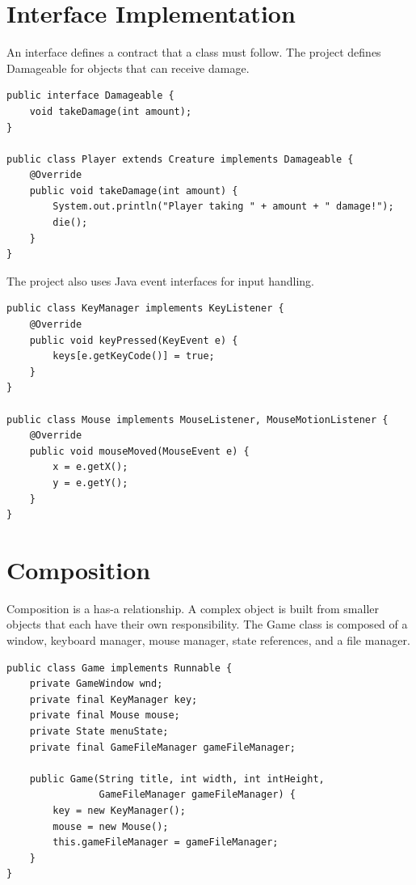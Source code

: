 \documentclass[12pt,a4paper]{article}
\begin{document}
\section*{Interface Implementation}
An interface defines a contract that a class must follow. The project defines Damageable for objects that can receive damage.

\begin{lstlisting}
public interface Damageable {
    void takeDamage(int amount);
}

public class Player extends Creature implements Damageable {
    @Override
    public void takeDamage(int amount) {
        System.out.println("Player taking " + amount + " damage!");
        die();
    }
}
\end{lstlisting}

The project also uses Java event interfaces for input handling.

\begin{lstlisting}
public class KeyManager implements KeyListener {
    @Override
    public void keyPressed(KeyEvent e) {
        keys[e.getKeyCode()] = true;
    }
}

public class Mouse implements MouseListener, MouseMotionListener {
    @Override
    public void mouseMoved(MouseEvent e) {
        x = e.getX();
        y = e.getY();
    }
}
\end{lstlisting}


\section*{Composition}
Composition is a has-a relationship. A complex object is built from smaller objects that each have their own responsibility. The Game class is composed of a window, keyboard manager, mouse manager, state references, and a file manager.

\begin{lstlisting}
public class Game implements Runnable {
    private GameWindow wnd;
    private final KeyManager key;
    private final Mouse mouse;
    private State menuState;
    private final GameFileManager gameFileManager;

    public Game(String title, int width, int intHeight,
                GameFileManager gameFileManager) {
        key = new KeyManager();
        mouse = new Mouse();
        this.gameFileManager = gameFileManager;
    }
}
\end{lstlisting}
\end{document}
